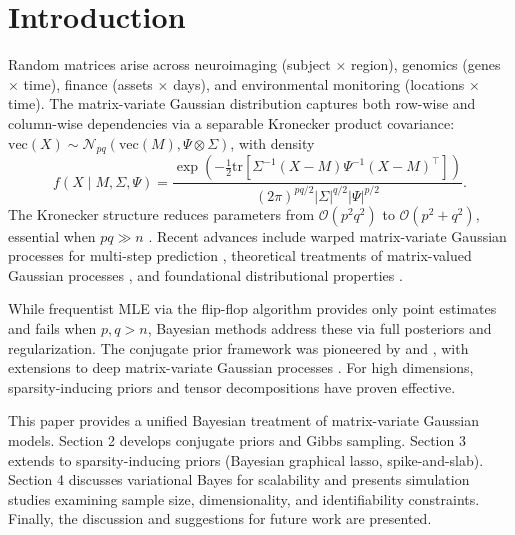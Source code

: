 \documentclass[twoside]{article}
\begin{document}
\section{Introduction}
Random matrices arise across neuroimaging (subject $\times$ region), genomics (genes $\times$ time), finance (assets $\times$ days), and environmental monitoring (locations $\times$ time). The matrix-variate Gaussian distribution captures both row-wise and column-wise dependencies via a separable Kronecker product covariance: $\text{vec}(X) \sim \mathcal{N}_{pq}(\text{vec}(M), \Psi \otimes \Sigma)$, with density
\begin{equation*}
f(X \mid M, \Sigma, \Psi) = \frac{\exp\left(-\frac{1}{2} \mathrm{tr}\left[ \Sigma^{-1} (X - M) \Psi^{-1} (X - M)^\top \right]\right)}{(2\pi)^{pq/2} |\Sigma|^{q/2} |\Psi|^{p/2}}.
\end{equation*}
The Kronecker structure reduces parameters from $\mathcal{O}(p^2q^2)$ to $\mathcal{O}(p^2+q^2)$, essential when $pq \gg n$ \cite{stegle2011}. Recent advances include warped matrix-variate Gaussian processes for multi-step prediction \cite{takano2025}, theoretical treatments of matrix-valued Gaussian processes \cite{Diaz2022}, and foundational distributional properties \cite{Barratt2018}.

\noindent While frequentist MLE via the flip-flop algorithm \cite{Dutilleul1999} provides only point estimates and fails when $p,q > n$, Bayesian methods address these via full posteriors and regularization. The conjugate prior framework was pioneered by \cite{Dawid1981} and \cite{Brown1993}, with extensions to deep matrix-variate Gaussian processes \cite{park2018}. For high dimensions, sparsity-inducing priors \cite{Wang2012} and tensor decompositions \cite{Petersen2019} have proven effective.

This paper provides a unified Bayesian treatment of matrix-variate Gaussian models. Section 2 develops conjugate priors and Gibbs sampling. Section 3 extends to sparsity-inducing priors (Bayesian graphical lasso, spike-and-slab). Section 4 discusses variational Bayes for scalability and presents simulation studies examining sample size, dimensionality, and identifiability constraints. Finally, the discussion and suggestions for future work are presented.
\end{document}
